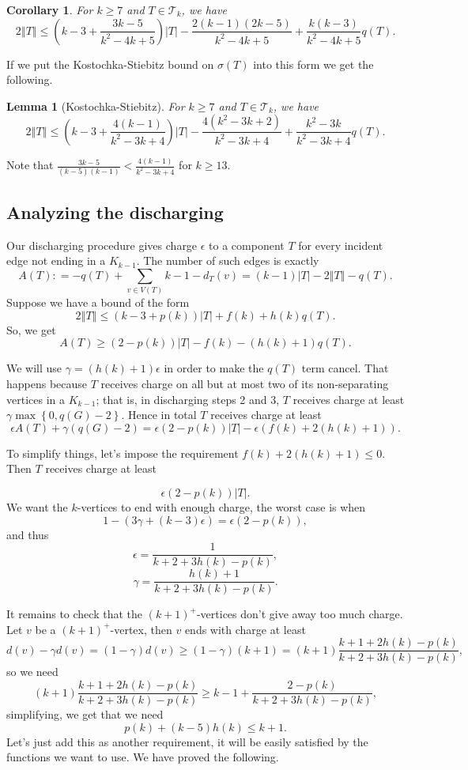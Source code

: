 \documentclass[12pt]{article}
\theoremstyle{plain}
\newtheorem{lem}[thm]{Lemma}
\newtheorem{cor}[thm]{Corollary}
\theoremstyle{definition}
\theoremstyle{remark}
\newcommand{\fancy}[1]{\mathcal{#1}}
\newcommand{\T}{\fancy{T}}
\newcommand{\set}[1]{\left\{ #1 \right\}}
\newcommand{\card}[1]{\left|#1\right|}
\newcommand{\size}[1]{\left\Vert#1\right\Vert}
\newcommand{\parens}[1]{\left( #1 \right)}
\newcommand{\DefinedAs}{\mathrel{\mathop:}=}
\begin{document}
\begin{cor}\label{SmallP}
	For $k \ge 7$ and $T \in \T_k$, we have
	\[2\size{T} \le \parens{k-3 + \frac{3k-5}{k^2 - 4k + 5}}\card{T} - \frac{2(k-1)(2k-5)}{k^2 - 4k + 5} + \frac{k(k-3)}{k^2 - 4k + 5}q(T).\]
\end{cor}

If we put the Kostochka-Stiebitz bound on $\sigma(T)$ into this form we get the following.

\begin{lem}[Kostochka-Stiebitz]
		For $k \ge 7$ and $T \in \T_k$, we have
		\[2\size{T} \le \parens{k-3 + \frac{4(k-1)}{k^2 - 3k + 4}}\card{T} - \frac{4(k^2-3k+2)}{k^2-3k+4} + \frac{k^2 - 3k}{k^2-3k+4}q(T).\]
\end{lem}

Note that $\frac{3k-5}{(k-5)(k-1)} < \frac{4(k-1)}{k^2 - 3k + 4}$ for $k \ge 13$.

\subsection{Analyzing the discharging}
Our discharging procedure gives charge $\epsilon$ to a component $T$ for every incident edge not ending in a $K_{k-1}$.  The number of such edges is exactly
\[A(T) \DefinedAs -q(T) + \sum_{v \in V(T)} k-1 - d_T(v) = (k-1)\card{T} - 2\size{T} - q(T).\]
Suppose we have a bound of the form
\[2\size{T} \le (k-3 + p(k))\card{T} + f(k) + h(k)q(T).\]
So, we get
\[A(T) \ge (2-p(k))\card{T} - f(k) - (h(k) + 1)q(T).\]

We will use $\gamma = (h(k) + 1)\epsilon$ in order to make the $q(T)$ term cancel.  That happens because $T$ receives charge on all but at most two of its non-separating vertices in a $K_{k-1}$; that is, in discharging steps 2 and 3, $T$ receives charge at least $\gamma\max\set{0, q(G) - 2}$.   Hence in total $T$ receives charge at least
\[\epsilon A(T) + \gamma(q(G) - 2) = \epsilon\parens{2-p(k)}\card{T} - \epsilon \parens{f(k) + 2(h(k) + 1)}.\]

To simplify things, let's impose the requirement $f(k) + 2(h(k) + 1) \le 0$.  Then $T$ receives charge at least

\[\epsilon\parens{2-p(k)}\card{T}.\]
We want the $k$-vertices to end with enough charge, the worst case is when
\[1 - (3\gamma + (k-3)\epsilon) = \epsilon\parens{2-p(k)},\]
and thus
\[\epsilon = \frac{1}{k+2 + 3h(k) - p(k)},\]
\[\gamma = \frac{h(k)+1}{k+2 + 3h(k) - p(k)}.\]

It remains to check that the $(k+1)^+$-vertices don't give away too much charge.  Let $v$ be a $(k+1)^+$-vertex, then $v$ ends with charge at least
\[d(v) - \gamma d(v) = (1-\gamma)d(v) \ge (1-\gamma)(k+1) = (k+1)\frac{k+1 + 2h(k) - p(k)}{k+2 + 3h(k) - p(k)},\]
so we need
\[(k+1)\frac{k+1 + 2h(k) - p(k)}{k+2 + 3h(k) - p(k)} \ge k-1 + \frac{2-p(k)}{k+2 + 3h(k) - p(k)},\]
simplifying, we get that we need
\[p(k) + (k-5)h(k) \le k+1.\]
Let's just add this as another requirement, it will be easily satisfied by the functions we want to use.  We have proved the following.
\end{document}
